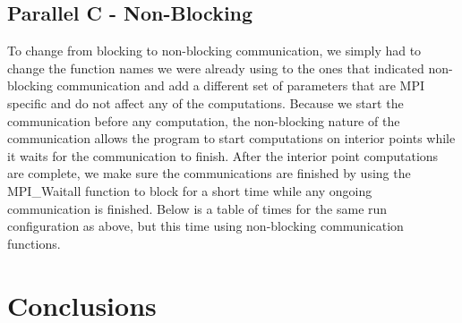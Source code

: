 \documentclass[11pt]{article}
\begin{document}
\begin{table}[!htbp]
\end{table}

\subsection{Parallel C - Non-Blocking}
To change from blocking to non-blocking communication, we simply had to change the function names we were already using to the ones that indicated non-blocking communication and add a different set of parameters that are MPI specific and do not affect any of the computations. Because we start the communication before any computation, the non-blocking nature of the communication allows the program to start computations on interior points while it waits for the communication to finish. After the interior point computations are complete, we make sure the communications are finished by using the MPI\_Waitall function to block for a short time while any ongoing communication is finished. Below is a table of times for the same run configuration as above, but this time using non-blocking communication functions.

\section{Conclusions}
\end{document}

